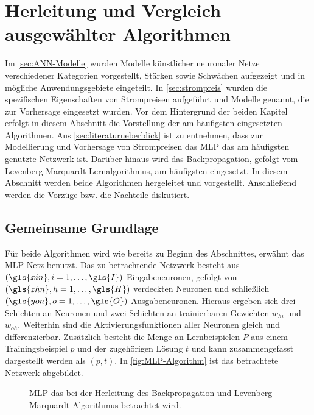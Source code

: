 


\section{Herleitung und Vergleich ausgewählter Algorithmen}\label{sec:algorithm}

Im \autoref{sec:ANN-Modelle} wurden Modelle künstlicher neuronaler Netze verschiedener Kategorien vorgestellt, Stärken sowie Schwächen aufgezeigt und in mögliche Anwendungsgebiete eingeteilt. In \autoref{sec:strompreis} wurden die spezifischen Eigenschaften von Strompreisen aufgeführt und Modelle genannt, die zur Vorhersage eingesetzt wurden. Vor dem Hintergrund der beiden Kapitel erfolgt in diesem Abschnitt die Vorstellung der am häufigsten eingesetzten Algorithmen. Aus \autoref{sec:literaturueberblick} ist zu entnehmen, dass zur Modellierung und Vorhersage von Strompreisen das MLP das am häufigsten genutzte Netzwerk ist. Darüber hinaus wird das Backpropagation, gefolgt vom Levenberg-Marquardt Lernalgorithmus, am häufigsten eingesetzt. In diesem Abschnitt werden beide Algorithmen hergeleitet und vorgestellt. Anschließend werden die Vorzüge bzw. die Nachteile diskutiert. 

\subsection{Gemeinsame Grundlage}
Für beide Algorithmen wird wie bereits zu Beginn des Abschnittes, erwähnt das MLP-Netz benutzt. Das zu betrachtende Netzwerk besteht aus $(\gls{xin}, i=1,\dots,\gls{I})$ Eingabeneuronen, \hbox{gefolgt} von $(\gls{zhn}, h=1,\dots,\gls{H})$ verdeckten Neuronen und schließlich $(\gls{yon}, o=1,\dots,\gls{O})$ \hbox{Ausgabeneuronen}. Hieraus ergeben sich drei Schichten an Neuronen und zwei Schichten an trainierbaren Gewichten $w_{hi}$ und $w_{oh}$. Weiterhin sind die Aktivierungsfunktionen aller Neuronen gleich und differenzierbar. Zusätzlich besteht die Menge an Lernbeispielen $P$ aus einem Trainingsbeispiel $p$ und der zugehörigen Lösung $t$ und kann zusammengefasst dargestellt werden als $(p,t)$. In \autoref{fig:MLP-Algorithm} ist das betrachtete Netzwerk abgebildet.


\begin{figure}[!htb]
    \centering
        
    \caption{MLP das bei der Herleitung des Backpropagation und Levenberg-Marquardt Algorithmus betrachtet wird.}
    \label{fig:MLP-Algorithm}
\end{figure}


